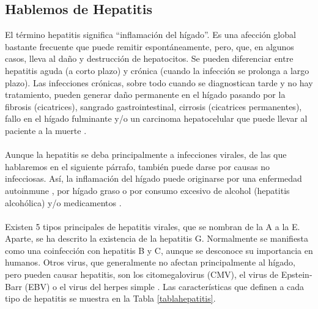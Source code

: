 \documentclass[11 pt]{article}
\begin{document}
\subsection{Hablemos de Hepatitis}
El término hepatitis significa “inflamación del hígado”. Es una afección global bastante frecuente que puede remitir espontáneamente, pero, que, en algunos casos, lleva al daño y destrucción de hepatocitos. Se pueden diferenciar entre hepatitis aguda (a corto plazo) y crónica (cuando la infección se prolonga a largo plazo). Las infecciones crónicas, sobre todo cuando se diagnostican tarde y no hay tratamiento, pueden generar daño permanente en el hígado pasando por la fibrosis (cicatrices), sangrado gastrointestinal, cirrosis (cicatrices permanentes), fallo en el hígado fulminante y/o un carcinoma hepatocelular que puede llevar al paciente a la muerte \cite{Mehta2020}.\\\\
Aunque la hepatitis se deba principalmente a infecciones virales, de las que hablaremos en el siguiente párrafo, también puede darse por causas no infecciosas. Así, la inflamación del hígado puede originarse por una enfermedad autoinmune \cite{Liberal2013}, por hígado graso \cite{NeuschwanderTetri2017} o por consumo excesivo de alcohol (hepatitis alcohólica) \cite{Chayanupatkul2014} y/o medicamentos \cite{Alempijevic2017}.\\\\
Existen 5 tipos principales de hepatitis virales, que se nombran de la A a la E. Aparte, se ha descrito la existencia de la hepatitis G. Normalmente se manifiesta como una coinfección con hepatitis B y C, aunque se desconoce su importancia en humanos. Otros virus, que generalmente no afectan principalmente al hígado, pero pueden causar hepatitis, son los citomegalovirus (CMV), el virus de Epstein-Barr (EBV) o el virus del herpes simple \cite{Mehta2020}. Las características que definen a cada tipo de hepatitis se muestra en la Tabla \ref*{tablahepatitis}.
\end{document}
